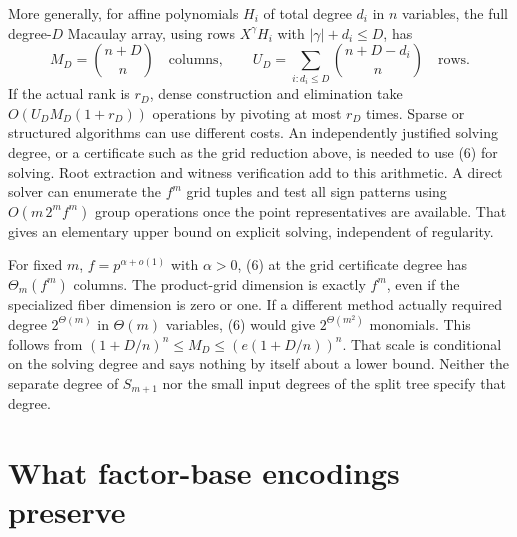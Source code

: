 \documentclass[11pt]{article}
\begin{document}
More generally, for affine polynomials \(H_i\) of total degree \(d_i\) in \(n\) variables, the full degree-\(D\) Macaulay array, using rows \(X^\gamma H_i\) with \(|\gamma|+d_i\le D\), has
\[
M_D=\binom{n+D}{n}\quad\text{columns},\qquad
U_D=\sum_{i:d_i\le D}\binom{n+D-d_i}{n}\quad\text{rows}.
\tag{6}
\]
If the actual rank is \(r_D\), dense construction and elimination take \(O(U_DM_D(1+r_D))\) operations by pivoting at most \(r_D\) times. Sparse or structured algorithms can use different costs. An independently justified solving degree, or a certificate such as the grid reduction above, is needed to use (6) for solving. Root extraction and witness verification add to this arithmetic. A direct solver can enumerate the \(f^m\) grid tuples and test all sign patterns using \(O(m\,2^m f^m)\) group operations once the point representatives are available. That gives an elementary upper bound on explicit solving, independent of regularity.

For fixed \(m\), \(f=p^{\alpha+o(1)}\) with \(\alpha>0\), (6) at the grid certificate degree has \(\Theta_m(f^m)\) columns. The product-grid dimension is exactly \(f^m\), even if the specialized fiber dimension is zero or one. If a different method actually required degree \(2^{\Theta(m)}\) in \(\Theta(m)\) variables, (6) would give \(2^{\Theta(m^2)}\) monomials. This follows from \((1+D/n)^n\le M_D\le (e(1+D/n))^n\). That scale is conditional on the solving degree and says nothing by itself about a lower bound. Neither the separate degree of \(S_{m+1}\) nor the small input degrees of the split tree specify that degree.

\section{What factor-base encodings preserve}
\end{document}
